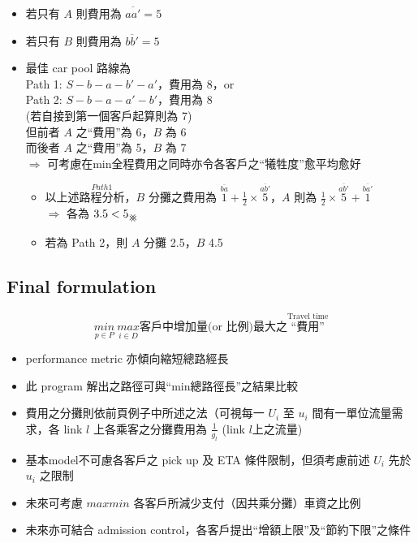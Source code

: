 \documentclass{article}
\newcommand\hash{\mathbin{\mathpalette\xhash\relax}}
\newcommand{\xhash}[2]{\ooalign{%
  $#1\xxhash{#1}{-45}$\cr
  $#1\xxhash{#1}{45}$\cr
  }%
}
\newcommand{\xxhash}[2]{\rotatebox[origin=c]{#2}{$#1\parallel$}}
\begin{document}
\begin{itemize}
  \item 若只有 $A$ 則費用為 $\overline{aa'} = 5$
  \item 若只有 $B$ 則費用為 $\overline{bb'} = 5$
  \item 最佳 car pool 路線為 \\
      Path 1: $S - b - a - b' - a'$，費用為 8，or \\
      Path 2: $S - b - a - a' - b'$，費用為 8 \\
      (若自接到第一個客戶起算則為 7) \\
      但前者 $A$ 之“費用”為 6，$B$ 為 6 \\
      而後者 $A$ 之“費用”為 5，$B$ 為 7 \\
      $\Longrightarrow$ 可考慮在min全程費用之同時亦令各客戶之“犧牲度”愈平均愈好
      \begin{itemize}
        \item 以上述$\overset{Path 1}{\text{路程分析}}$，$B$ 分攤之費用為 $\overset{\overline{ba}}{1} + \frac{1}{2} \times \overset{\overline{ab'}}{5}$，$A$ 則為 $\frac{1}{2} \times \overset{\overline{ab'}}{5} + \overset{\overline{ba'}}{1}$ \\
          $\Longrightarrow$ 各為 $3.5 < 5_{\hash}$
        \item 若為 Path 2，則 $A$ 分攤 2.5，$B$ 4.5
      \end{itemize}
\end{itemize}

\newpage
\subsection*{Final formulation}
\[
  \underset{p \in P}{min}\ \underset{i \in D}{max} \text{客戶中增加量(or 比例)最大之} \overset{\text{Travel time}}{\text{“費用”}}
\]
\begin{itemize}
  \item performance metric 亦傾向縮短總路經長
  \item 此 program 解出之路徑可與“min總路徑長”之結果比較
  \item 費用之分攤則依前頁例子中所述之法（可視每一 $U_i$ 至 $u_i$ 間有一單位流量需求，各 link $l$ 上各乘客之分攤費用為 $\frac{1}{g_l}$ (link $l$上之流量)
  \item 基本model不可慮各客戶之 pick up 及 ETA 條件限制，但須考慮前述 $U_i$ 先於 $u_i$ 之限制
  \item 未來可考慮 $max min$ 各客戶所減少支付（因共乘分攤）車資之比例
  \item 未來亦可結合 admission control，各客戶提出“增額上限”及“節約下限”之條件
\end{itemize}
\end{document}
